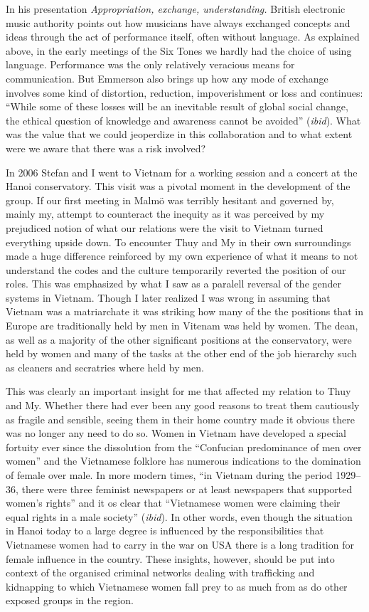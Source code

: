 \documentclass[a4paper]{article}
\begin{document}
In his presentation \emph{Appropriation, exchange, understanding.} \citep{emmerson06} British electronic music authority points out how musicians have always exchanged concepts and ideas through the act of performance itself, often without language. As explained above, in the early meetings of the Six Tones we hardly had the choice of using language. Performance was the only relatively veracious means for communication. But Emmerson also brings up how any mode of exchange involves some kind of distortion, reduction, impoverishment or loss and continues: ``While some of these losses will be an inevitable result of global social change, the ethical question of knowledge and awareness cannot be avoided'' (\emph{ibid}). What was the value that we could jeoperdize in this collaboration and to what extent were we aware that there was a risk involved? 

In 2006 Stefan and I went to Vietnam for a working session and a concert at the Hanoi conservatory. This visit was a pivotal moment in the development of the group. If our first meeting in Malmö was terribly hesitant and governed by, mainly my, attempt to counteract the inequity as it was perceived by my prejudiced notion of what our relations were the visit to Vietnam turned everything upside down. To encounter Thuy and My in their own surroundings made a huge difference reinforced by my own experience of what it means to not understand the codes and the culture temporarily reverted the position of our roles. This was emphasized by what I saw as a paralell reversal of the gender systems in Vietnam. Though I later realized I was wrong in assuming that Vietnam was a matriarchate it was striking how many of the the positions that in Europe are traditionally held by men in Vitenam was held by women. The dean, as well as a majority of the other significant positions at the conservatory, were held by women and many of the tasks at the other end of the job hierarchy such as cleaners and secratries where held by men.

This was clearly an important insight for me that affected my relation to Thuy and My. Whether there had ever been any good reasons to treat them cautiously as fragile and sensible, seeing them in their home country made it obvious there was no longer any need to do so. Women in Vietnam have developed a special fortuity ever since the dissolution from the ``Confucian predominance of men over women''\citep{VanKy2002} and the Vietnamese folklore has numerous indications to the domination of female over male. In more modern times, ``in Vietnam during the period 1929–36, there were three feminist newspapers or at least newspapers that supported women’s rights'' and it os clear that ``Vietnamese women were claiming their equal rights in a male society'' (\emph{ibid}). In other words, even though the situation in Hanoi today to a large degree is influenced by the responsibilities that Vietnamese women had to carry in the war on USA there is a long tradition for female influence in the country. These insights, however, should be put into context of the organised criminal networks dealing with trafficking and kidnapping to which Vietnamese women fall prey to as much from as do other exposed groups in the region.
\end{document}
